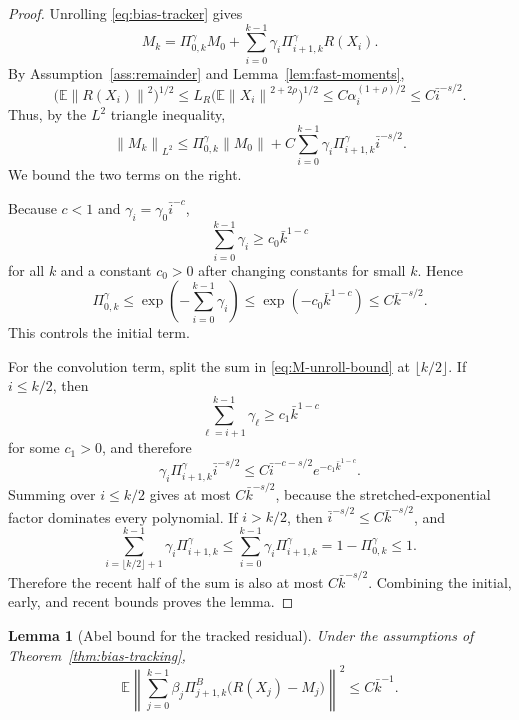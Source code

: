 \documentclass{article}
\newtheorem{lemma}[theorem]{Lemma}
\newcommand{\E}{\mathbb{E}}
\newcommand{\norm}[1]{\left\lVert #1\right\rVert}
\begin{document}
\begin{proof}
Unrolling \eqref{eq:bias-tracker} gives
\[
  M_k=\Pi^\gamma_{0,k}M_0+
  \sum_{i=0}^{k-1}\gamma_i\Pi^\gamma_{i+1,k}R(X_i).
\]
By Assumption~\ref{ass:remainder} and Lemma~\ref{lem:fast-moments},
\[
  \big(\E\norm{R(X_i)}^2\big)^{1/2}
  \le L_R\big(\E\norm{X_i}^{2+2\rho}\big)^{1/2}
  \le C\alpha_i^{(1+\rho)/2}
  \le C\bar i^{-s/2}. \label{eq:R-L2-decay-bias}
\]
Thus, by the $L^2$ triangle inequality,
\begin{equation}
  \norm{M_k}_{L^2}
  \le \Pi^\gamma_{0,k}\norm{M_0}
     +C\sum_{i=0}^{k-1}\gamma_i\Pi^\gamma_{i+1,k}\bar i^{-s/2}. \label{eq:M-unroll-bound}
\end{equation}
We bound the two terms on the right.

Because $c<1$ and $\gamma_i=\gamma_0\bar i^{-c}$,
\[
  \sum_{i=0}^{k-1}\gamma_i
  \ge c_0\bar k^{1-c}
\]
for all $k$ and a constant $c_0>0$ after changing constants for small $k$. Hence
\[
  \Pi^\gamma_{0,k}
  \le \exp\!\left(-\sum_{i=0}^{k-1}\gamma_i\right)
  \le \exp(-c_0\bar k^{1-c})
  \le C\bar k^{-s/2}.
\]
This controls the initial term.

For the convolution term, split the sum in \eqref{eq:M-unroll-bound} at $\lfloor k/2\rfloor$. If $i\le k/2$, then
\[
  \sum_{\ell=i+1}^{k-1}\gamma_\ell\ge c_1\bar k^{1-c}
\]
for some $c_1>0$, and therefore
\[
  \gamma_i\Pi^\gamma_{i+1,k}\bar i^{-s/2}
  \le C\bar i^{-c-s/2}e^{-c_1\bar k^{1-c}}.
\]
Summing over $i\le k/2$ gives at most $C\bar k^{-s/2}$, because the stretched-exponential factor dominates every polynomial. If $i>k/2$, then $\bar i^{-s/2}\le C\bar k^{-s/2}$, and
\[
  \sum_{i=\lfloor k/2\rfloor+1}^{k-1}\gamma_i\Pi^\gamma_{i+1,k}
  \le \sum_{i=0}^{k-1}\gamma_i\Pi^\gamma_{i+1,k}
  =1-\Pi^\gamma_{0,k}
  \le 1.
\]
Therefore the recent half of the sum is also at most $C\bar k^{-s/2}$. Combining the initial, early, and recent bounds proves the lemma.
\end{proof}

\begin{lemma}[Abel bound for the tracked residual]
\label{lem:tracked-residual-abel}
Under the assumptions of Theorem~\ref{thm:bias-tracking},
\begin{equation}
  \E\left\|
  \sum_{j=0}^{k-1}\beta_j\Pi^B_{j+1,k}\big(R(X_j)-M_j\big)
  \right\|^2
  \le C\bar k^{-1}. \label{eq:tracked-residual-bound}
\end{equation}
\end{lemma}
\end{document}

